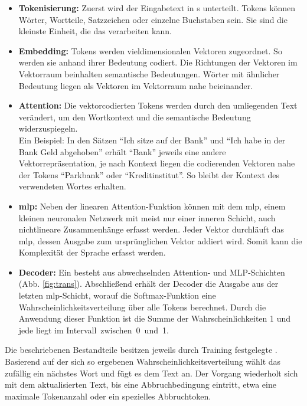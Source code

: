 \documentclass[../main.tex]{subfiles}
\begin{document}
\begin{itemize}

\item \textbf{Tokenisierung:} Zuerst wird der Eingabetext in s unterteilt. Tokens können Wörter, Wortteile, Satzzeichen oder einzelne Buchstaben sein. Sie sind die kleinste Einheit, 
die das  verarbeiten kann.\cite{architecture}

\item \textbf{Embedding:} Tokens werden vieldimensionalen Vektoren zugeordnet. So werden sie anhand ihrer Bedeutung codiert. Die Richtungen der Vektoren im
Vektorraum beinhalten semantische Bedeutungen. Wörter mit ähnlicher Bedeutung liegen als Vektoren im Vektorraum nahe beieinander.\cite{embedding}

\item \textbf{Attention:} Die vektorcodierten Tokens werden durch den umliegenden Text verändert, um den Wortkontext und die semantische Bedeutung widerzuspiegeln.\\
Ein Beispiel: In den Sätzen "`Ich sitze auf der Bank"' und "`Ich habe in der Bank Geld abgehoben"' erhält "`Bank"' jeweils eine andere Vektorrepräsentation, je nach Kontext liegen die codierenden 
Vektoren nahe der Tokens "`Parkbank"' oder "`Kreditinstitut"'. So bleibt der Kontext des verwendeten Wortes erhalten.\cite{attention, attention2} 

\item \textbf{\acrfull{mlp}:} Neben der linearen Attention-Funktion können mit dem \acrshort{mlp}, einem kleinen neuronalen Netzwerk mit meist nur einer inneren Schicht, auch nichtlineare Zusammenhänge 
erfasst werden. Jeder Vektor durchläuft das \acrshort{mlp}, dessen Ausgabe zum ursprünglichen Vektor addiert wird. Somit kann die Komplexität der Sprache erfasst werden.\cite{mlp}

\item \textbf{Decoder:} Ein  besteht aus abwechselnden Attention- und MLP-Schichten (Abb. \ref{fig:trans}). Abschließend erhält der Decoder die Ausgabe aus der letzten 
\acrshort{mlp}-Schicht, worauf die Softmax-Funktion eine Wahrscheinlichkeitsverteilung über alle Tokens berechnet. Durch die Anwendung dieser Funktion ist die Summe der Wahrscheinlichkeiten 1 und jede liegt im \mbox{Intervall zwischen 0 und 1.\cite{architecture}}
\end{itemize}

Die beschriebenen Bestandteile besitzen jeweils durch Training festgelegte . Basierend auf der sich so ergebenen Wahrscheinlichkeitsverteilung wählt das  zufällig ein nächstes Wort und fügt es dem Text an. Der Vorgang wiederholt sich mit dem aktualisierten Text, 
bis eine Abbruchbedingung eintritt, etwa eine maximale Tokenanzahl oder ein spezielles Abbruchtoken.\cite{architecture}\\
\end{document}
